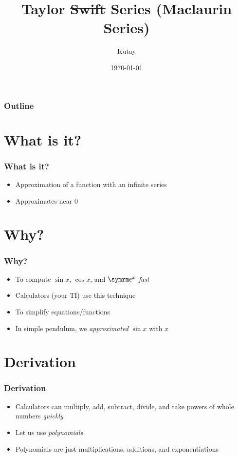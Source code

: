 \documentclass{beamer}
\title{Taylor \sout{Swift} Series (Maclaurin Series)}
\author{Kutay}
\institute{Made with LaTeX}
\date{\today}
\begin{document}
\begin{frame}
  \titlepage
\end{frame}

\begin{frame}
  \frametitle{Outline}
  \tableofcontents
\end{frame}

\section{What is it?}

\begin{frame}
  \frametitle{What is it?}
  \begin{itemize}
    \item Approximation of a function with an infinite series
    \item Approximates near 0
  \end{itemize}
\end{frame}

\section{Why?}

\begin{frame}
  \frametitle{Why?}
  \begin{itemize}
    \item To compute \( \sin x \), \( \cos x \), and \( \e^x \) \textit{fast}
    \item Calculators (your TI) use this technique
    \item To simplify equations/functions
    \item In simple pendulum, we \textit{approximated} \( \sin x \) with \( x \)
  \end{itemize}
\end{frame}

\section{Derivation}

\begin{frame}
  \frametitle{Derivation}
  \begin{itemize}
    \item Calculators can multiply, add, subtract, divide, and take powers of whole numbers \textit{quickly}
    \item Let us use \textit{polynomials}
    \item Polynomials are just multiplications, additions, and exponentiations
  \end{itemize}
\end{frame}
\end{document}
